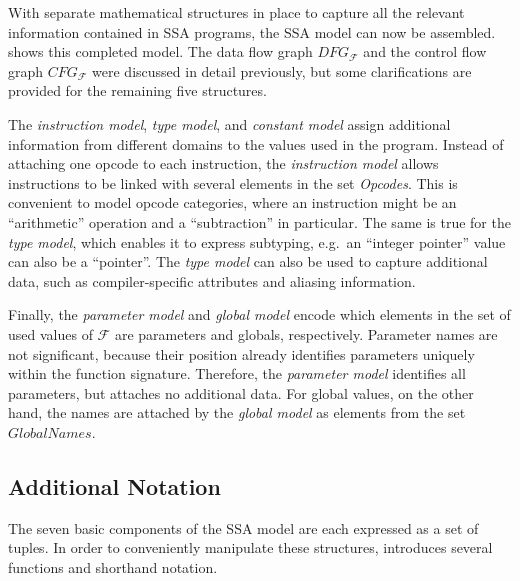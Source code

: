 \begin{figure}[p]
    
\end{figure}

    With separate mathematical structures in place to capture all the relevant
    information contained in SSA programs, the SSA model can now be assembled.
     shows this completed model.
    The data flow graph $DFG_\mathcal F$ and the control flow graph
    $CFG_\mathcal F$ were discussed in detail previously, but some
    clarifications are provided for the remaining five structures.

    The {\it instruction model}, {\it type model}, and {\it constant model}
    assign additional information from different domains to the values used in
    the program.
    Instead of attaching one opcode to each instruction, the
    {\it instruction model} allows instructions to be linked with several
    elements in the set {\it Opcodes}.
    This is convenient to model opcode categories, where an instruction might be
    an ``arithmetic'' operation and a ``subtraction'' in particular.
    The same is true for the {\it type model}, which enables it to express
    subtyping, e.g.\ an ``integer pointer'' value can also be a ``pointer''.
    The {\it type model} can also be used to capture additional data, such as
    compiler-specific attributes and aliasing information.
    
    Finally, the {\it parameter model} and {\it global model} encode which
    elements in the set of used values of $\mathcal F$ are parameters and
    globals, respectively.
    Parameter names are not significant, because their position already
    identifies parameters uniquely within the function signature.
    Therefore, the {\it parameter model} identifies all parameters, but attaches
    no additional data.
    For global values, on the other hand, the names are attached by the
    {\it global model} as elements from the set $GlobalNames$.

\subsection{Additional Notation}

    The seven basic components of the SSA model are each expressed as a set of
    tuples.
    In order to conveniently manipulate these structures, 
     introduces several functions and shorthand notation.

